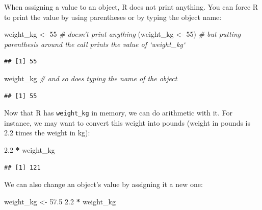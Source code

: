 \documentclass[
]{article}
\newenvironment{Shaded}{\begin{snugshade}}{\end{snugshade}}
\newcommand{\CommentTok}[1]{\textcolor[rgb]{0.56,0.35,0.01}{\textit{#1}}}
\newcommand{\DecValTok}[1]{\textcolor[rgb]{0.00,0.00,0.81}{#1}}
\newcommand{\FloatTok}[1]{\textcolor[rgb]{0.00,0.00,0.81}{#1}}
\newcommand{\NormalTok}[1]{#1}
\newcommand{\OperatorTok}[1]{\textcolor[rgb]{0.81,0.36,0.00}{\textbf{#1}}}
\newcommand{\StringTok}[1]{\textcolor[rgb]{0.31,0.60,0.02}{#1}}
\begin{document}
When assigning a value to an object, R does not print anything. You can
force R to print the value by using parentheses or by typing the object
name:

\begin{Shaded}
\begin{Highlighting}[]
\NormalTok{weight_kg <-}\StringTok{ }\DecValTok{55}    \CommentTok{# doesn't print anything}
\NormalTok{(weight_kg <-}\StringTok{ }\DecValTok{55}\NormalTok{)  }\CommentTok{# but putting parenthesis around the call prints the value of `weight_kg`}
\end{Highlighting}
\end{Shaded}

\begin{verbatim}
## [1] 55
\end{verbatim}

\begin{Shaded}
\begin{Highlighting}[]
\NormalTok{weight_kg          }\CommentTok{# and so does typing the name of the object}
\end{Highlighting}
\end{Shaded}

\begin{verbatim}
## [1] 55
\end{verbatim}

Now that R has \texttt{weight\_kg} in memory, we can do arithmetic with
it. For instance, we may want to convert this weight into pounds (weight
in pounds is 2.2 times the weight in kg):

\begin{Shaded}
\begin{Highlighting}[]
\FloatTok{2.2} \OperatorTok{*}\StringTok{ }\NormalTok{weight_kg}
\end{Highlighting}
\end{Shaded}

\begin{verbatim}
## [1] 121
\end{verbatim}

We can also change an object's value by assigning it a new one:

\begin{Shaded}
\begin{Highlighting}[]
\NormalTok{weight_kg <-}\StringTok{ }\FloatTok{57.5}
\FloatTok{2.2} \OperatorTok{*}\StringTok{ }\NormalTok{weight_kg}
\end{Highlighting}
\end{Shaded}
\end{document}
